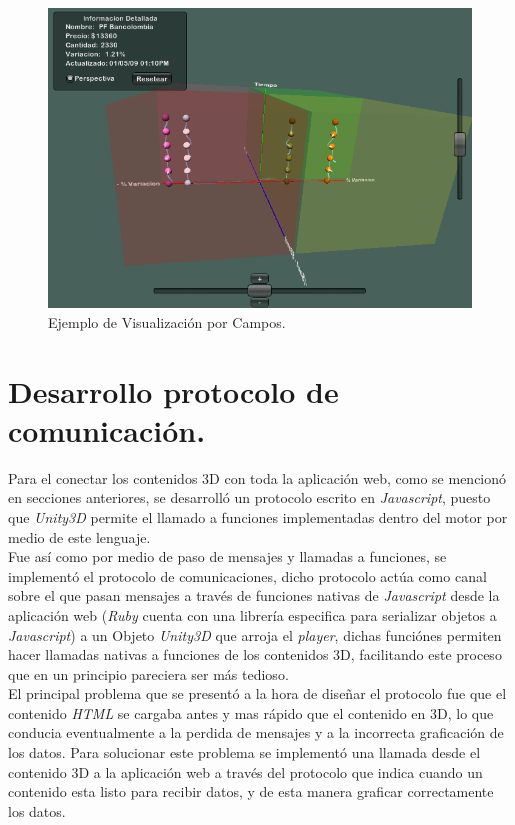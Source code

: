 \begin{figure}[h]
	\centering
		\includegraphics[scale=0.3]{Campo.png}
		\caption{Ejemplo de Visualización por Campos.}
	\label{fig:Campo}
\end{figure}
 

\section{Desarrollo protocolo de comunicación.}

Para el conectar los contenidos 3D con toda la aplicación web, como se mencionó en secciones anteriores, se desarrolló un protocolo escrito en \emph{Javascript}, puesto que \emph{Unity3D} permite el llamado a funciones implementadas dentro del motor por medio de este lenguaje.\\ 

Fue así como por medio de paso de mensajes y llamadas a funciones, se implementó el protocolo de comunicaciones, dicho protocolo actúa como canal sobre el que pasan mensajes a través de funciones nativas de \emph{Javascript} desde la aplicación web (\emph{Ruby} cuenta con una librería especifica para serializar objetos a \emph{Javascript}) a un Objeto \emph{Unity3D} que arroja el \emph{player}, dichas funciónes permiten hacer llamadas nativas a funciones de los contenidos 3D, facilitando este proceso que en un principio pareciera ser más tedioso.\\

El principal problema que se presentó a la hora de diseñar el protocolo fue que el contenido  \emph{HTML} se cargaba antes y mas rápido que el contenido en 3D, lo que conducia eventualmente a la perdida de mensajes y a la incorrecta graficación de los datos. Para solucionar este problema se implementó una llamada desde el contenido 3D a la aplicación web  a través del protocolo que indica cuando un contenido esta listo para recibir datos, y de esta manera graficar correctamente los datos.

